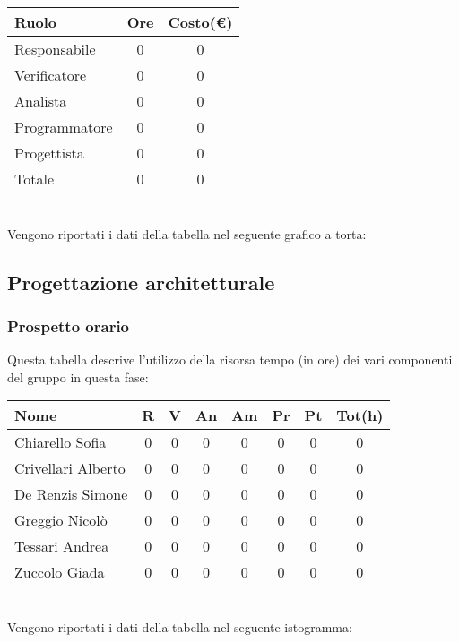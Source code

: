 \begin{tabular}{|l|c|c|}
\hline
Ruolo & Ore & Costo(€)\\
\hline
Responsabile & 0 & 0\\
Verificatore & 0 & 0\\
Analista & 0 & 0\\
Programmatore & 0 & 0\\
Progettista & 0 & 0\\
Totale & 0& 0\\
\hline
\end{tabular}\\


Vengono riportati i dati della tabella nel seguente grafico a torta: \\


\subsection{Progettazione architetturale}

\subsubsection{Prospetto orario}
Questa tabella descrive l'utilizzo della risorsa tempo (in ore) dei vari componenti del gruppo in questa fase: \\

\begin{tabular}{|l|cccccc|c|}
\hline
Nome & R &  V & An & Am & Pr & Pt & Tot(h)\\
\hline
Chiarello Sofia & 0 & 0 & 0 & 0 & 0 & 0 & 0\\
Crivellari Alberto & 0 & 0 & 0 & 0 & 0 & 0 & 0\\
De Renzis Simone & 0 & 0 & 0 & 0 & 0 & 0 & 0\\
Greggio Nicolò & 0 & 0 & 0 & 0 & 0 & 0 & 0\\
Tessari Andrea & 0 & 0 & 0 & 0 & 0 & 0 & 0\\
Zuccolo Giada & 0 & 0 & 0 & 0 & 0 & 0 & 0\\
\hline
\end{tabular}
\\
Vengono riportati i dati della tabella nel seguente istogramma: \\

